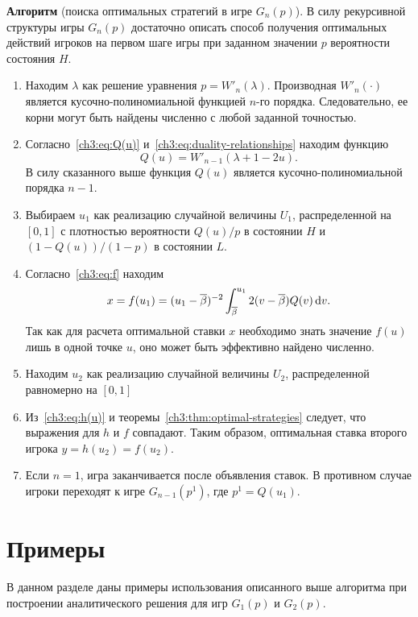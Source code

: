 {\noindent
\textbf{Алгоритм} (поиска оптимальных стратегий в игре $G_n(p)$).
В силу рекурсивной структуры игры $G_n(p)$ достаточно описать способ получения оптимальных действий игроков на первом шаге игры при заданном значении $p$ вероятности состояния $H$.
\begin{enumerate}
\item
  Находим $\lambda$ как решение уравнения 
  $
    p = W'_n(\lambda).
  $
  Производная $W'_n(\cdot)$ является кусочно-полиномиальной функцией $n$-го порядка.
  Следовательно, ее корни могут быть найдены численно с любой заданной точностью.
\item
  Согласно~\eqref{ch3:eq:Q(u)} и~\eqref{ch3:eq:duality-relationships} находим функцию 
  \[
    Q(u) = W'_{n-1}(\lambda + 1 - 2u).
  \]
  В силу сказанного выше функция $Q(u)$ является кусочно-полиномиальной порядка $n-1$.
\item
  Выбираем $u_1$ как реализацию случайной величины $U_1$, распределенной на $[0, 1]$ с плотностью вероятности $Q(u)/p$ в состоянии $H$ и $\left(1 - Q(u)\right)/(1-p)$ в состоянии $L$.
\item
  Согласно~\eqref{ch3:eq:f} находим 
  \[
    x = f(u_1) = (u_1 - {{\overline{\beta}}})^{-2} \int_{{{\overline{\beta}}}}^{u_1} 2 (v - {{\overline{\beta}}}) Q(v) \mathop{}\!\mathrm{d} v.
  \]
  Так как для расчета оптимальной ставки $x$ необходимо знать значение $f(u)$ лишь в одной точке $u$, оно может быть эффективно найдено численно.
\item
  Находим $u_2$ как реализацию случайной величины $U_2$, распределенной равномерно на $[0, 1]$
\item
  Из~\eqref{ch3:eq:h(u)} и теоремы~\ref{ch3:thm:optimal-strategies} следует, что выражения для $h$ и $f$ совпадают.
  Таким образом, оптимальная ставка второго игрока $y = h(u_2) = f(u_2)$.
\item
  Если $n = 1$, игра заканчивается после объявления ставок. В противном случае игроки переходят к игре $G_{n-1}(p^1)$, где $p^1 = Q(u_1)$.
\end{enumerate}

\section{Примеры}
В данном разделе даны примеры использования описанного выше алгоритма при построении аналитического решения для игр $G_1(p)$ и $G_2(p)$.

}
